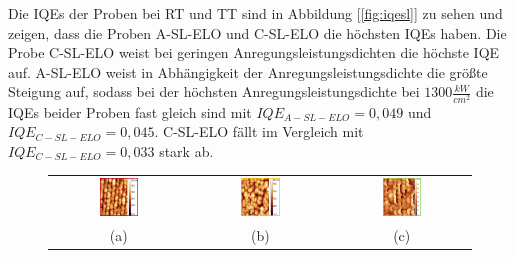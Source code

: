 \noindent 
%
Die IQEs der Proben bei RT und TT sind in Abbildung [\ref{fig:iqesl}] zu sehen und zeigen, dass die Proben A-SL-ELO und C-SL-ELO die höchsten IQEs haben. Die Probe C-SL-ELO weist bei geringen Anregungsleistungsdichten die höchste IQE auf. A-SL-ELO weist in Abhängigkeit der Anregungsleistungsdichte die größte Steigung auf, sodass bei der höchsten Anregungsleistungsdichte bei $ 1300 \frac{kW}{cm^2} $ die IQEs beider Proben fast gleich sind mit $IQE_{A-SL-ELO} = 0,049 $ und $IQE_{C-SL-ELO} = 0,045$. C-SL-ELO fällt im Vergleich mit $IQE_{C-SL-ELO} = 0,033$ stark ab.  
%
\begin{figure}[H]
\begin{tabular}{ccc}
  \includegraphics[width=0.30\textwidth]{Bilder/TS4048/aSLELOafm.png} & \includegraphics[width=0.30\textwidth]{Bilder/TS4048/bSLELOafm.png}  & \includegraphics[width=0.30\textwidth]{Bilder/TS4048/cSLELOafm.png} \\
(a) & (b) & (c) \\[6pt]

\end{tabular}
\end{figure}

